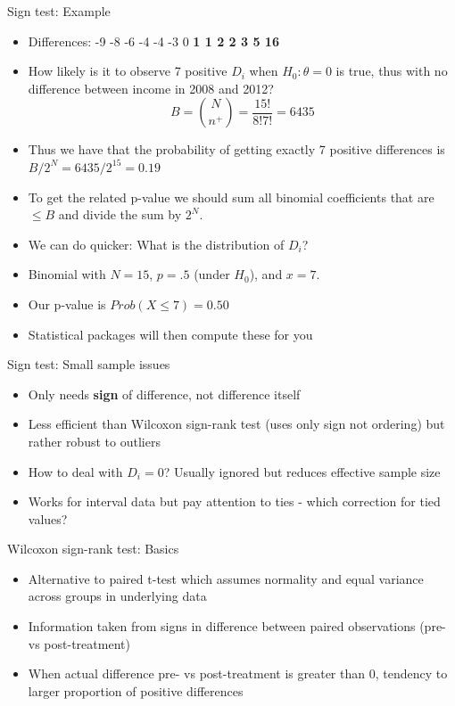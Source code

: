 \documentclass[xcolor=table,dvipsnames]{beamer}
\begin{document}
\begin{frame}{Sign test: Example}
\begin{itemize}
\item Differences:  -9 -8 -6 -4 -4 -3 0 \textbf{1 1 2 2 3 5 16} \pause
\item How likely is it to observe 7 positive $D_i$ when $H_0: \theta=0$ is true, thus with no difference between income in 2008 and 2012? \pause
$$B={N\choose n^+}=\frac{15!}{8! 7!}=6435$$
\item Thus we have that the probability of getting exactly 7 positive differences is $B/2^N=6435/2^{15}=0.19$
\item To get the related p-value we should sum all binomial coefficients that are $\leq B$ and divide the sum by $2^N$. \pause
\item We can do quicker: What is the distribution of $D_i$? \pause
\item Binomial with $N=15$, $p=.5$ (under $H_0$), and $x=7$. \pause
\item Our p-value is $Prob(X\leq 7) = 0.50$ \pause
\item Statistical packages will then compute these for you
\end{itemize}	
\end{frame}

\begin{frame}{Sign test: Small sample issues}
\begin{itemize}
\item Only needs \textbf{sign} of difference, not difference itself \pause
\item Less efficient than Wilcoxon sign-rank test (uses only sign not ordering) but rather robust to outliers \pause
\item How to deal with $D_i=0$? Usually ignored but reduces effective sample size \pause
\item Works for interval data but pay attention to ties - which correction for tied values?
\end{itemize}
\end{frame}

\begin{frame}{Wilcoxon sign-rank test: Basics}
\begin{itemize}
\item Alternative to paired t-test which assumes normality and equal variance across groups in underlying data \pause
\item Information taken from signs in difference between paired observations (pre- vs post-treatment)\pause
\item When actual difference pre- vs post-treatment is greater than 0, tendency to larger proportion of positive differences
\end{itemize}
\end{frame}
\end{document}
